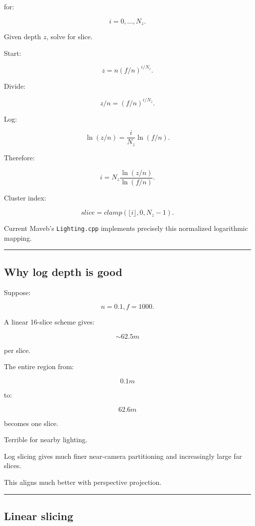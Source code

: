for:

\[
i=0,\dots,N_z.
\]

Given depth \(z\), solve for slice.

Start:

\[
z=
n(f/n)^{i/N_z}.
\]

Divide:

\[
z/n=
(f/n)^{i/N_z}.
\]

Log:

\[
\ln(z/n)
=
\frac i{N_z}
\ln(f/n).
\]

Therefore:

\[
\boxed{
i
=
N_z
\frac{
\ln(z/n)
}{
\ln(f/n)
}.
}
\]

Cluster index:

\[
slice=
clamp(
\lfloor i\rfloor,
0,
N_z-1
).
\]

Current Maveb's \texttt{Lighting.cpp} implements precisely this normalized logarithmic mapping.

\begin{center}\rule{0.5\linewidth}{0.5pt}\end{center}

\subsection{Why log depth is good}\label{04-visual-computing-ii-ch040-why-log-depth-is-good}

\hypertarget{04-visual-computing-ii-ch040-why-log-depth-is-good}{}

Suppose:

\[
n=0.1,
f=1000.
\]

A linear 16-slice scheme gives:

\[
\sim62.5m
\]

per slice.

The entire region from:

\[
0.1m
\]

to:

\[
62.6m
\]

becomes one slice.

Terrible for nearby lighting.

Log slicing gives much finer near-camera partitioning and increasingly large far slices.

This aligns much better with perspective projection.

\begin{center}\rule{0.5\linewidth}{0.5pt}\end{center}

\subsection{Linear slicing}\label{04-visual-computing-ii-ch040-linear-slicing}

